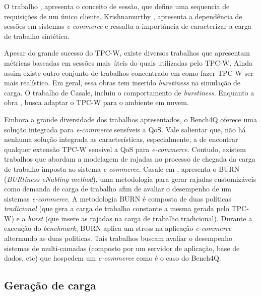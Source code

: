 
O trabalho \cite{cherkasova1998}, apresenta o conceito de sessão, que define uma sequencia de requisições de um único cliente. Krishnamurthy \cite{Krishnamurthy2006}, apresenta a dependência de sessões em sistemas \textit{e-commerce} e ressalta a importância de caracterizar a carga de trabalho sintética.

Apesar do grande sucesso do TPC-W, existe diversos trabalhos que apresentam métricas baseadas em sessões mais úteis do quais utilizadas pelo TPC-W. Ainda assim existe outro conjunto de trabalhos concentrado em como fazer TPC-W ser mais realístico. Em geral, essa obras tem inserido \textit{burstiness} na simulação de carga. O trabalho \cite{Mi2009} de Casale, incluiu o comportamento de \textit{burstiness}. Enquanto a obra \cite{Sobel2008}, busca adaptar o TPC-W para o ambiente em nuvem.

Embora a grande diversidade dos trabalhos apresentados, o Bench4Q oferece uma solução integrada para \textit{e-commerce} sensíveis a QoS. Vale salientar que, não há nenhuma solução integrada as características, especialmente, a de encontrar qualquer extensão TPC-W sensível a QoS para \textit{e-commerce}. Contudo, existem trabalhos que abordam a modelagem de rajadas no processo de chegada da carga de trabalho imposta ao sistema \textit{e-commerce}. Casale em \cite{Casale2012}, apresenta o BURN (\textit{BURtiness eNabling method}), uma metodologia para gerar rajadas customizáveis como demanda de carga de trabalho afim de avaliar o desempenho de um sistemas \textit{e-commerce}. A metodologia BURN é composta de duas políticas \textit{tradicional} (que gera a carga de trabalho constante a mesma gerada pelo TPC-W) e a \textit{burst} (que insere as rajadas na carga de trabalho tradicional). Durante a execução do \textit{benchmark}, BURN aplica um stress na aplicação \textit{e-commerce} alternando as duas politicas. Tais trabalhos buscam avaliar o desempenho sistemas de multi-camadas (composto por um servidor de aplicação, base de dados, etc) que hospedem um \textit{e-commerce} como é o caso do Bench4Q.

\subsection{Geração de carga}

